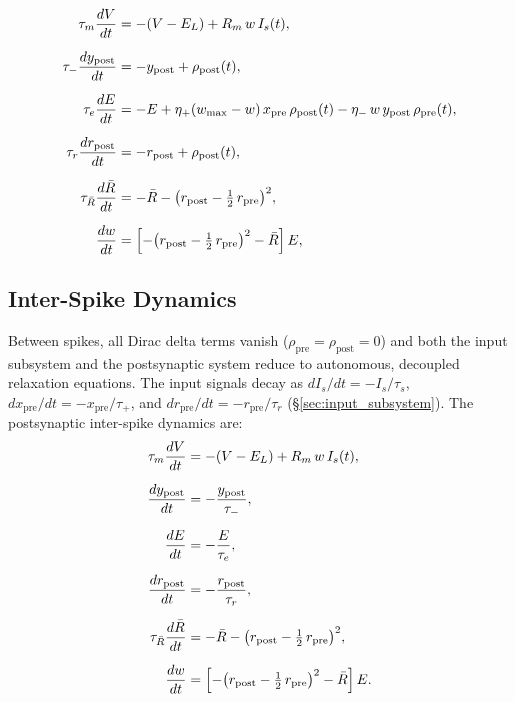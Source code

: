 \documentclass[11pt]{article}
\theoremstyle{definition}
\begin{document}
\begin{align}
    \tau_m \frac{dV}{dt} &= -(V - E_L) + R_m\, w\, I_s(t), \label{eq:reduced_V} \\[6pt]
    \tau_- \frac{dy_{\mathrm{post}}}{dt} &= -y_{\mathrm{post}} + \rho_{\mathrm{post}}(t), \label{eq:reduced_ypost} \\[6pt]
    \tau_e \frac{dE}{dt} &= -E + \eta_+(w_{\mathrm{max}} - w)\, x_{\mathrm{pre}}\, \rho_{\mathrm{post}}(t) - \eta_-\, w\, y_{\mathrm{post}}\, \rho_{\mathrm{pre}}(t), \label{eq:reduced_E} \\[6pt]
    \tau_r \frac{dr_{\mathrm{post}}}{dt} &= -r_{\mathrm{post}} + \rho_{\mathrm{post}}(t), \label{eq:reduced_rpost} \\[6pt]
    \tau_{\bar{R}} \frac{d\bar{R}}{dt} &= -\bar{R} - \bigl(r_{\mathrm{post}} - \tfrac{1}{2}\, r_{\mathrm{pre}}\bigr)^2, \label{eq:reduced_Rbar} \\[6pt]
    \frac{dw}{dt} &= \Bigl[-\bigl(r_{\mathrm{post}} - \tfrac{1}{2}\, r_{\mathrm{pre}}\bigr)^2 - \bar{R}\Bigr]\, E, \label{eq:reduced_w}
\end{align}

\subsection{Inter-Spike Dynamics} \label{sec:interspike}

Between spikes, all Dirac delta terms vanish ($\rho_{\mathrm{pre}} = \rho_{\mathrm{post}} = 0$) and both the input subsystem and the postsynaptic system reduce to autonomous, decoupled relaxation equations. The input signals decay as $dI_s/dt = -I_s/\tau_s$, $dx_{\mathrm{pre}}/dt = -x_{\mathrm{pre}}/\tau_+$, and $dr_{\mathrm{pre}}/dt = -r_{\mathrm{pre}}/\tau_r$ (\S\ref{sec:input_subsystem}). The postsynaptic inter-spike dynamics are:
\begin{align}
    \tau_m \frac{dV}{dt} &= -(V - E_L) + R_m\, w\, I_s(t), \label{eq:inter_V} \\[6pt]
    \frac{dy_{\mathrm{post}}}{dt} &= -\frac{y_{\mathrm{post}}}{\tau_-}, \label{eq:inter_ypost} \\[6pt]
    \frac{dE}{dt} &= -\frac{E}{\tau_e}, \label{eq:inter_E} \\[6pt]
    \frac{dr_{\mathrm{post}}}{dt} &= -\frac{r_{\mathrm{post}}}{\tau_r}, \label{eq:inter_rpost} \\[6pt]
    \tau_{\bar{R}} \frac{d\bar{R}}{dt} &= -\bar{R} - \bigl(r_{\mathrm{post}} - \tfrac{1}{2}\, r_{\mathrm{pre}}\bigr)^2, \label{eq:inter_Rbar} \\[6pt]
    \frac{dw}{dt} &= \Bigl[-\bigl(r_{\mathrm{post}} - \tfrac{1}{2}\, r_{\mathrm{pre}}\bigr)^2 - \bar{R}\Bigr]\, E. \label{eq:inter_w}
\end{align}
\end{document}
